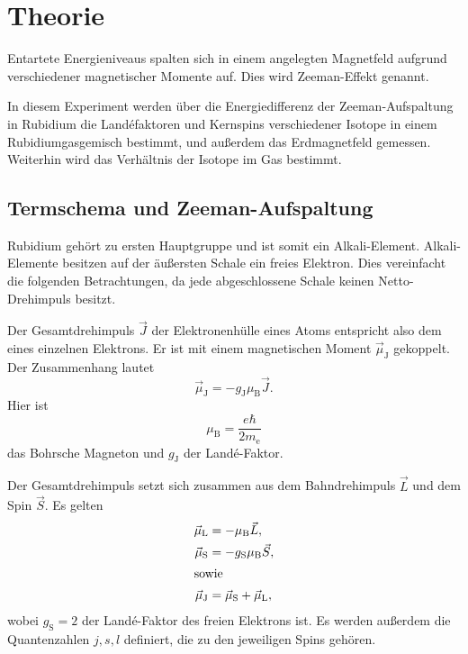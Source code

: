 \section{Theorie}%
\label{sec:theorie}

Entartete Energieniveaus spalten sich in einem angelegten Magnetfeld
aufgrund verschiedener magnetischer Momente
auf.
Dies wird Zeeman-Effekt genannt.

In diesem Experiment werden über die Energiedifferenz der
Zeeman-Aufspaltung in Rubidium
die Land\'efaktoren und Kernspins verschiedener Isotope
in einem Rubidiumgasgemisch bestimmt,
und außerdem das Erdmagnetfeld gemessen.
Weiterhin wird das Verhältnis der Isotope im Gas bestimmt.


\subsection{Termschema und Zeeman-Aufspaltung}%
\label{sub:termschema_und_zeeman_aufspaltung}

Rubidium gehört zu ersten Hauptgruppe und ist somit ein Alkali-Element.
Alkali-Elemente besitzen auf der äußersten Schale ein freies Elektron.
Dies vereinfacht die folgenden Betrachtungen, da jede abgeschlossene Schale
keinen Netto-Drehimpuls besitzt.

Der Gesamtdrehimpuls $\vec{J}$ der Elektronenhülle eines Atoms entspricht also
dem eines einzelnen Elektrons.
Er ist mit einem magnetischen Moment $\vec{\mu}_{\text{J}}$ gekoppelt.
Der Zusammenhang lautet
\begin{equation}
  \vec{\mu}_{\text{J}} = -g_{\text{J}} \mu_{\text{B}} \vec{J}.
\end{equation}
Hier ist
\begin{equation}
  \mu_{\text{B}} = \frac{e \hbar}{2 m_\text{e}}
\end{equation}
das Bohrsche Magneton und $g_{\text{J}}$ der Land\'e-Faktor.

Der Gesamtdrehimpuls setzt sich zusammen aus dem Bahndrehimpuls $\vec{L}$ und
dem Spin $\vec{S}$.
Es gelten
\begin{align}
  \vec{\mu}_{\text{L}} &= -\mu_{\text{B}} \vec{L}, \\
  \vec{\mu}_{\text{S}} &= -g_{\text{S}} \mu_{\text{B}} \vec{S}, \\
  \intertext{sowie}
  \vec{\mu}_{\text{J}} &= \vec{\mu}_{\text{S}} + \vec{\mu}_{\text{L}},
\end{align}
wobei $g_{\text{S}} = \num{2}$ der Land\'e-Faktor des freien Elektrons ist.
Es werden außerdem die Quantenzahlen $j, s, l$ definiert, die zu den jeweiligen Spins
gehören.

